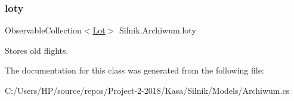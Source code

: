 \subsubsection{\texorpdfstring{loty}{loty}}
{\footnotesize\ttfamily Observable\+Collection$<$\mbox{\hyperlink{class_silnik_1_1_lot}{Lot}}$>$ Silnik.\+Archiwum.\+loty}



Stores old flights. 



The documentation for this class was generated from the following file\+:\begin{DoxyCompactItemize}
\item 
C\+:/\+Users/\+H\+P/source/repos/\+Project-\/2-\/2018/\+Kasa/\+Silnik/\+Models/Archiwum.\+cs\end{DoxyCompactItemize}
